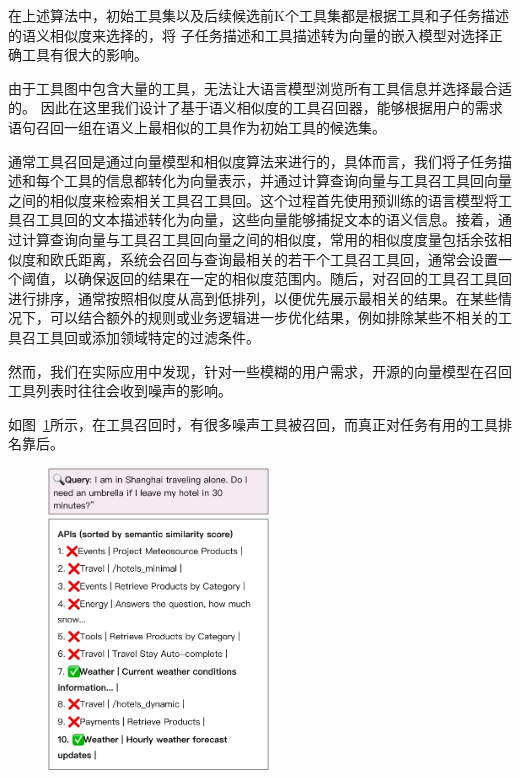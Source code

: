 在上述算法中，初始工具集以及后续候选前K个工具集都是根据工具和子任务描述的语义相似度来选择的，将
子任务描述和工具描述转为向量的嵌入模型对选择正确工具有很大的影响。

由于工具图中包含大量的工具，无法让大语言模型浏览所有工具信息并选择最合适的。
因此在这里我们设计了基于语义相似度的工具召回器，能够根据用户的需求语句召回一组在语义上最相似的工具作为初始工具的候选集。

通常工具召回是通过向量模型和相似度算法来进行的，具体而言，我们将子任务描述和每个工具的信息都转化为向量表示，并通过计算查询向量与工具召工具回向量之间的相似度来检索相关工具召工具回。这个过程首先使用预训练的语言模型将工具召工具回的文本描述转化为向量，这些向量能够捕捉文本的语义信息。接着，通过计算查询向量与工具召工具回向量之间的相似度，常用的相似度度量包括余弦相似度和欧氏距离，系统会召回与查询最相关的若干个工具召工具回，通常会设置一个阈值，以确保返回的结果在一定的相似度范围内。随后，对召回的工具召工具回进行排序，通常按照相似度从高到低排列，以便优先展示最相关的结果。在某些情况下，可以结合额外的规则或业务逻辑进一步优化结果，例如排除某些不相关的工具召工具回或添加领域特定的过滤条件。

然而，我们在实际应用中发现，针对一些模糊的用户需求，开源的向量模型在召回工具列表时往往会收到噪声的影响。

如图~\ref{fig:why-tune}所示，在工具召回时，有很多噪声工具被召回，而真正对任务有用的工具排名靠后。

\begin{figure}[!htp]
  \vspace{1em}
  \centering
  \setlength{\abovecaptionskip}{10pt} %
  \includegraphics[height=8cm]{../assets/ch3-为何需要微调.pdf}
  \label{fig:why-tune}
\end{figure}

